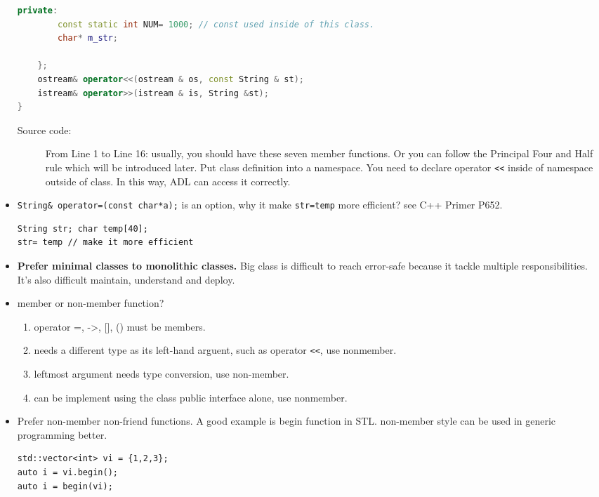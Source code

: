 \documentclass[a4paper,11pt,twoside]{book}
\begin{document}
\begin{itemize}
\begin{lstlisting}[frame=single, language=c++]
	private:
		const static int NUM= 1000; // const used inside of this class.
		char* m_str;
		
	};
	ostream& operator<<(ostream & os, const String & st);
	istream& operator>>(istream & is, String &st);
}
\end{lstlisting}
\begin{description}
    \item[Source code:] From Line 1 to Line 16: usually, you should have these seven member functions. Or you can follow the Principal Four and Half rule which will be introduced later.  Put class definition into a namespace. You need to declare operator \verb=<<= inside of namespace outside of class. In this way, ADL can access it correctly.
\end{description}

        \item \texttt{String\& operator=(const char*a);} is an option, why it make \texttt{str=temp} more efficient? see C++ Primer P652.
	
\begin{lstlisting}[numbers=none]
String str; char temp[40];
str= temp // make it more efficient
\end{lstlisting}
	
	
    \item \textbf{Prefer minimal classes to monolithic classes.} Big class is difficult to reach error-safe because it tackle multiple responsibilities. It's also difficult maintain, understand and deploy.

	\item member or non-member function?
	\begin{enumerate}
		\item operator =, ->, [], () must be members.
		\item needs a different type as its left-hand arguent, such as operator \verb=<<=, use nonmember.
		\item leftmost argument needs type conversion, use non-member.
		\item can be implement using the class public interface alone, use nonmember.
	\end{enumerate}

	\item Prefer non-member non-friend functions. A good example is begin function in STL. non-member style can be used in generic programming better.  

\begin{lstlisting}[numbers=none]
std::vector<int> vi = {1,2,3};
auto i = vi.begin();
auto i = begin(vi);
\end{lstlisting}
	
\end{itemize}
\end{document}
